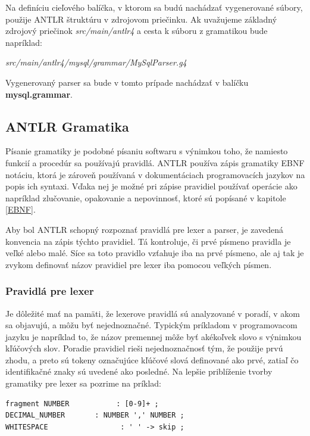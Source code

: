 Na definíciu cieľového balíčka, v ktorom sa budú nachádzať vygenerované súbory, použije \mbox{ANTLR}  štruktúru v zdrojovom priečinku. Ak uvažujeme základný zdrojový priečinok \textit{src/main/antlr4} a cesta k súboru z gramatikou bude napríklad:

\begin{center}
\textit{src/main/antlr4/mysql/grammar/MySqlParser.g4}
\end{center}

Vygenerovaný parser sa bude v tomto prípade nachádzať v balíčku \textbf{mysql.grammar}.

\subsection{ANTLR Gramatika}\label{antlr_grammar}
Písanie gramatiky je podobné písaniu softwaru s výnimkou toho, že namiesto funkcií a procedúr sa používajú pravidlá. ANTLR používa zápis gramatiky EBNF notáciu, ktorá je zároveň používaná v dokumentáciach programovacích jazykov na popis ich syntaxi. Vďaka nej je možné pri zápise pravidiel používať operácie ako napríklad zlučovanie, opakovanie a nepovinnosť, ktoré sú popísané v kapitole \ref{EBNF}.

Aby bol ANTLR schopný rozpoznať pravidlá pre lexer a parser, je zavedená konvencia na zápis týchto pravidiel. Tá kontroluje, či prvé písmeno pravidla je veľké alebo malé. Síce sa toto pravidlo vzťahuje iba na prvé písmeno, ale aj tak je zvykom definovať názov pravidiel pre lexer iba pomocou veľkých písmen. 

\subsubsection{Pravidlá pre lexer}
Je dôležité mať na pamäti, že lexerove pravidlá sú analyzované v poradí, v akom sa objavujú, a môžu byť nejednoznačné. Typickým príkladom v programovacom jazyku je napríklad to, že názov premennej môže byť akékoľvek slovo s výnimkou kľúčových slov. Poradie pravidiel rieši nejednoznačnosť tým, že použije prvú zhodu, a preto sú tokeny označujúce kľúčové slová definované ako prvé, zatiaľ čo identifikačné znaky sú uvedené ako posledné. Na lepšie priblíženie tvorby gramatiky pre lexer sa pozrime na príklad:

\begin{lstlisting}[basicstyle=\small, keepspaces=true]
fragment NUMBER           : [0-9]+ ;
DECIMAL_NUMBER       : NUMBER ',' NUMBER ;
WHITESPACE                 : ' ' -> skip ;
\end{lstlisting}

